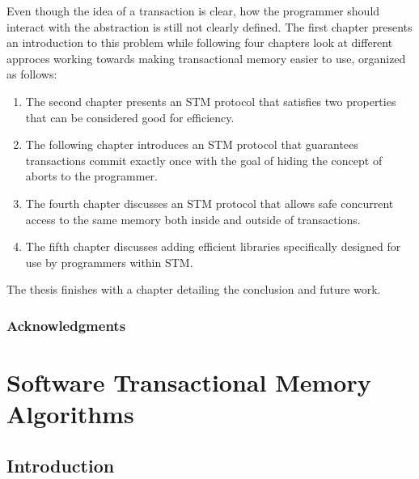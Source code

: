 \documentclass[11pt]{book}
\begin{document}
Even though the idea of a transaction is clear, how the programmer should interact with the
abstraction is still not clearly defined.
The first chapter presents an introduction to this problem
while following four chapters look at different approces working towards
making transactional memory easier to use, organized as follows:
\begin{enumerate}
\item The second chapter presents an STM protocol that satisfies two properties that can be considered good for efficiency.
\item The following chapter introduces an STM protocol that guarantees transactions commit exactly once with the goal of hiding the concept of aborts to the programmer.
\item The fourth chapter discusses an STM protocol that allows safe concurrent access to the same memory both inside and outside of transactions.
\item The fifth chapter discusses adding efficient libraries specifically designed for use by
programmers within STM.
\end{enumerate}
The thesis finishes with a chapter detailing the conclusion and future work.



\newpage

\section*{Acknowledgments}
%

\sloppy

\tableofcontents      	%
\listoffigures        	%
\clearpage




\part{Software Transactional Memory Algorithms}

\chapter{Introduction}
%
%

\end{document}
